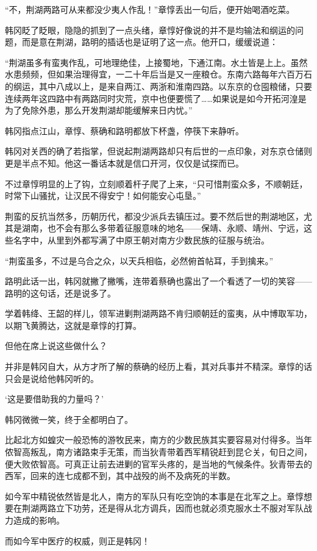 “不，荆湖两路可从来都没少夷人作乱！”章惇丢出一句后，便开始喝酒吃菜。

韩冈眨了眨眼，隐隐的抓到了一点头绪，章惇好像说的并不是均输法和纲运的问题，而是意在荆湖，路明的插话也是证明了这一点。他开口，缓缓说道：

“荆湖虽多有蛮夷作乱，可地理绝佳，上接蜀地，下通江南。水土皆是上上。虽然水患频频，但如果治理得宜，一二十年后当是又一座粮仓。东南六路每年六百万石的纲运，其中八成以上，是来自两江、两浙和淮南四路。以东京的仓囤粮储，只要连续两年这四路中有两路同时灾荒，京中也便要慌了……如果说是如今开拓河湟是为了免除外患，那么开发荆湖却能缓解来日内忧。”

韩冈指点江山，章惇、蔡确和路明都放下杯盏，停筷下来静听。

韩冈对关西的确了若指掌，但说起荆湖两路却只有后世的一点印象，对东京仓储则更是半点不知。他这一番话本就是信口开河，仅仅是试探而已。

不过章惇明显的上了钩，立刻顺着杆子爬了上来，“只可惜荆蛮众多，不顺朝廷，时常下山骚扰，让汉民不得安宁！如何能安心屯垦。”

荆蛮的反抗当然多，历朝历代，都没少派兵去镇压过。要不然后世的荆湖地区，尤其是湖南，也不会有那么多带着征服意味的地名——保靖、永顺、靖州、宁远，这些名字中，从里到外都写满了中原王朝对南方少数民族的征服与统治。

“荆蛮虽多，不过是乌合之众，以天兵相临，必然俯首帖耳，手到擒来。”

路明此话一出，韩冈就撇了撇嘴，连带着蔡确也露出了一个看透了一切的笑容——路明的这句话，还是说多了。

学着韩绛、王韶的样儿，领军进剿荆湖两路不肯归顺朝廷的蛮夷，从中博取军功，以期飞黄腾达，这就是章惇的打算。

但他在席上说这些做什么？

并非是韩冈自大，从方才所了解的蔡确的经历上看，其对兵事并不精深。章惇的话只会是说给他韩冈听的。

‘这是要借助我的力量吗？’

韩冈微微一笑，终于全都明白了。

比起北方如蝗灾一般恐怖的游牧民来，南方的少数民族其实要容易对付得多。当年侬智高叛乱，南方诸路束手无策，而当狄青带着西军精锐赶到昆仑关，旬日之间，便大败侬智高。可真正让前去进剿的官军头疼的，是当地的气候条件。狄青带去的西军，回来的连七成都不到，其中战殁的尚不及病死的半数。

如今军中精锐依然皆是北人，南方的军队只有吃空饷的本事是在北军之上。章惇想要在荆湖两路立下功劳，还是得从北方调兵，因而也就必须克服水土不服对军队战力造成的影响。

而如今军中医疗的权威，则正是韩冈！

